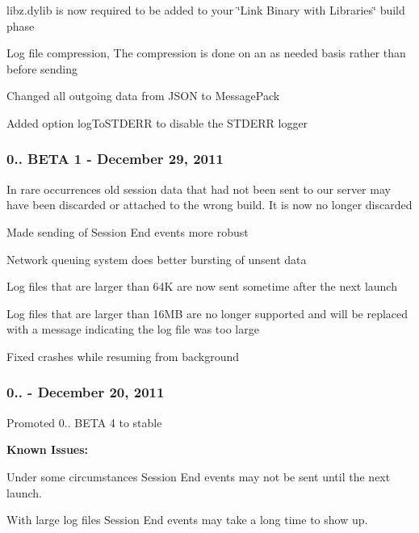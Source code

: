 \begin{DoxyItemize}
\item libz.\-dylib is now required to be added to your \char`\"{}\-Link Binary with Libraries\char`\"{} build phase
\item Log file compression, The compression is done on an as needed basis rather than before sending
\item Changed all outgoing data from J\-S\-O\-N to Message\-Pack
\item Added option {\ttfamily log\-To\-S\-T\-D\-E\-R\-R} to disable the {\ttfamily S\-T\-D\-E\-R\-R} logger
\end{DoxyItemize}

\subsubsection*{0.. B\-E\-T\-A 1 -\/ December 29, 2011}


\begin{DoxyItemize}
\item In rare occurrences old session data that had not been sent to our server may have been discarded or attached to the wrong build. It is now no longer discarded
\item Made sending of Session End events more robust
\item Network queuing system does better bursting of unsent data
\item Log files that are larger than 64\-K are now sent sometime after the next launch
\item Log files that are larger than 16\-M\-B are no longer supported and will be replaced with a message indicating the log file was too large
\item Fixed crashes while resuming from background
\end{DoxyItemize}

\subsubsection*{0.. -\/ December 20, 2011}


\begin{DoxyItemize}
\item Promoted 0.. B\-E\-T\-A 4 to stable
\end{DoxyItemize}

{\bfseries Known Issues\-:}


\begin{DoxyItemize}
\item Under some circumstances Session End events may not be sent until the next launch.
\item With large log files Session End events may take a long time to show up.
\end{DoxyItemize}

